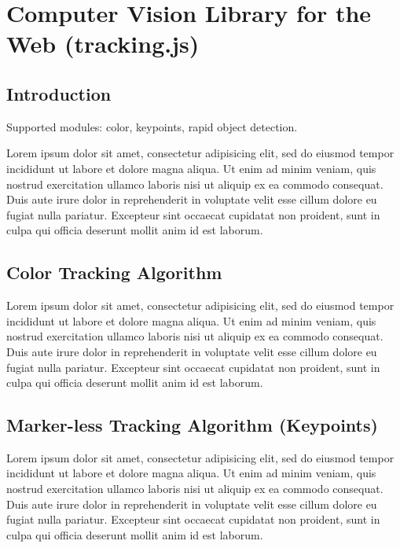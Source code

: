 \chapter{Computer Vision Library for the Web (tracking.js)} %
\label{cha:computer_vision_library_for_the_web}

\section{Introduction} %
\label{sec:computer_vision_library_for_the_web:introduction}

Supported modules: color, keypoints, rapid object detection.

Lorem ipsum dolor sit amet, consectetur adipisicing elit, sed do eiusmod
tempor incididunt ut labore et dolore magna aliqua. Ut enim ad minim veniam,
quis nostrud exercitation ullamco laboris nisi ut aliquip ex ea commodo
consequat. Duis aute irure dolor in reprehenderit in voluptate velit esse
cillum dolore eu fugiat nulla pariatur. Excepteur sint occaecat cupidatat non
proident, sunt in culpa qui officia deserunt mollit anim id est laborum.


\section{Color Tracking Algorithm} %
\label{sec:computer_vision_library_for_the_web:color_tracking_algorithm}

Lorem ipsum dolor sit amet, consectetur adipisicing elit, sed do eiusmod
tempor incididunt ut labore et dolore magna aliqua. Ut enim ad minim veniam,
quis nostrud exercitation ullamco laboris nisi ut aliquip ex ea commodo
consequat. Duis aute irure dolor in reprehenderit in voluptate velit esse
cillum dolore eu fugiat nulla pariatur. Excepteur sint occaecat cupidatat non
proident, sunt in culpa qui officia deserunt mollit anim id est laborum.


\section{Marker-less Tracking Algorithm (Keypoints)} %
\label{sec:computer_vision_library_for_the_web:marker_less_tracking_algorithm}

Lorem ipsum dolor sit amet, consectetur adipisicing elit, sed do eiusmod
tempor incididunt ut labore et dolore magna aliqua. Ut enim ad minim veniam,
quis nostrud exercitation ullamco laboris nisi ut aliquip ex ea commodo
consequat. Duis aute irure dolor in reprehenderit in voluptate velit esse
cillum dolore eu fugiat nulla pariatur. Excepteur sint occaecat cupidatat non
proident, sunt in culpa qui officia deserunt mollit anim id est laborum.

